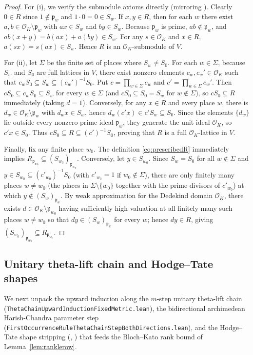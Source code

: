 \documentclass[11pt]{amsart}
\newcommand{\Oc}{\mathcal{O}}
\newcommand{\fp}{\mathfrak{p}}
\theoremstyle{plain}
\theoremstyle{definition}
\numberwithin{equation}{section}
\begin{document}
\begin{proof}
For (i), we verify the submodule axioms directly (mirroring ). Clearly
$0\in R$ since $1\notin\fp_w$ and $1\cdot 0=0\in S_w$. If $x,y\in R$, then for each $w$ there exist
$a,b\in\Oc_K\setminus\fp_w$ with $ax\in S_w$ and $by\in S_w$. Because $\fp_w$ is prime,
$ab\notin\fp_w$, and $ab(x+y)=b(ax)+a(by)\in S_w$. For any $s\in\Oc_K$ and $x\in R$, $a(sx)=s(ax)\in
S_w$. Hence $R$ is an $\Oc_K$-submodule of $V$.

For (ii), let $\Sigma$ be the finite set of places where $S_w\neq S_0$. For each $w\in\Sigma$,
because $S_w$ and $S_0$ are full lattices in $V$, there exist nonzero elements $c_w,c_w'\in\Oc_K$
such that $c_w S_0\subseteq S_w\subseteq (c_w')^{-1}S_0$. Put $c=\prod_{w\in\Sigma}c_w$ and
$c'=\prod_{w\in\Sigma}c_w'$. Then $c S_0\subseteq c_w S_0\subseteq S_w$ for every $w\in\Sigma$ (and
$cS_0\subseteq S_0=S_w$ for $w\notin\Sigma$), so $cS_0\subseteq R$ immediately (taking $d=1$).
Conversely, for any $x\in R$ and every place $w$, there is $d_w\in\Oc_K\setminus\fp_w$ with
$d_w x\in S_w$, hence $d_w(c'x)\in c'S_w\subseteq S_0$. Since the elements $\{d_w\}$ lie outside
every nonzero prime ideal $\fp_w$, they generate the unit ideal $\Oc_K$, so $c'x\in S_0$. Thus
$cS_0\subseteq R\subseteq (c')^{-1}S_0$, proving that $R$ is a full $\Oc_K$-lattice in $V$.

Finally, fix any finite place $w_0$. The definition \eqref{eq:prescribedR} immediately implies
$R_{\fp_{w_0}}\subseteq (S_{w_0})_{\fp_{w_0}}$. Conversely, let $y\in S_{w_0}$. Since $S_w=S_0$ for
all $w\notin\Sigma$ and $y\in S_{w_0}\subseteq (c'_{w_0})^{-1}S_0$ (with $c'_{w_0}=1$ if
$w_0\notin\Sigma$), there are only finitely many places $w\neq w_0$ (the places in
$\Sigma\setminus\{w_0\}$ together with the prime divisors of $c'_{w_0}$) at which
$y\notin(S_w)_{\fp_w}$. By weak approximation for the Dedekind domain $\Oc_K$, there exists
$d\in\Oc_K\setminus\fp_{w_0}$ having sufficiently high valuation at all finitely many such places
$w\neq w_0$ so that $dy\in(S_w)_{\fp_w}$ for every $w$; hence $dy\in R$, giving
$(S_{w_0})_{\fp_{w_0}}\subseteq R_{\fp_{w_0}}$.
\end{proof}

\subsection{Unitary theta-lift chain and Hodge--Tate shapes}

We next unpack the upward induction along the $m$-step unitary theta-lift chain
(\texttt{ThetaChainUpward\allowbreak Induction\allowbreak FixedMetric.lean}), the bidirectional
archimedean Harish-Chandra parameter step (\texttt{FirstOccurrenceRule\allowbreak ThetaChainStep\allowbreak BothDirections.lean}),
and the Hodge--Tate shape stripping (, ) that feeds the
Bloch--Kato rank bound of Lemma~\ref{lem:ranklerow}.
\end{document}

